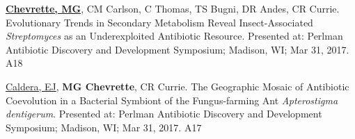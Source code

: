 

\begin{cvpubs}

  \cvpub
    {\underline{\textbf{Chevrette, MG}}, CM Carlson, C Thomas, TS Bugni, DR Andes, CR Currie.  Evolutionary Trends in Secondary Metabolism Reveal Insect-Associated \textit{Streptomyces} as an Underexploited Antibiotic Resource.  Presented at: Perlman Antibiotic Discovery and Development Symposium; Madison, WI; Mar 31, 2017.} %
    {A18} %

  \cvpub
    {\underline{Caldera, EJ}, \textbf{MG Chevrette}, CR Currie.  The Geographic Mosaic of Antibiotic Coevolution in a Bacterial Symbiont of the Fungus-farming Ant \textit{Apterostigma dentigerum}.  Presented at: Perlman Antibiotic Discovery and Development Symposium; Madison, WI; Mar 31, 2017.} %
    {A17} %

\end{cvpubs}
